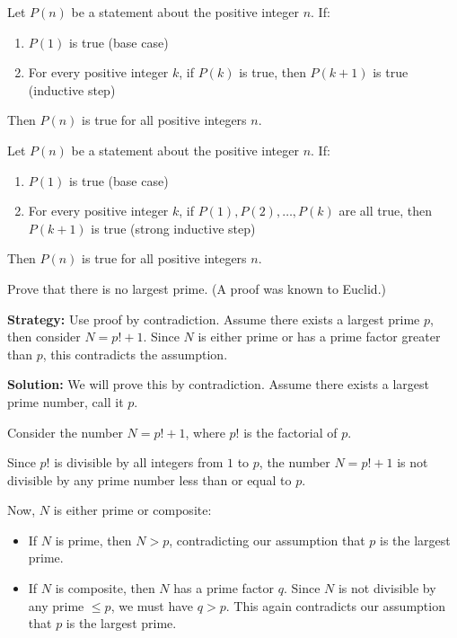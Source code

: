 \begin{theorem}
Let $P(n)$ be a statement about the positive integer $n$. If:
\begin{enumerate}
\item $P(1)$ is true (base case)
\item For every positive integer $k$, if $P(k)$ is true, then $P(k+1)$ is true (inductive step)
\end{enumerate}
Then $P(n)$ is true for all positive integers $n$.
\end{theorem}

\begin{theorem}
Let $P(n)$ be a statement about the positive integer $n$. If:
\begin{enumerate}
\item $P(1)$ is true (base case)
\item For every positive integer $k$, if $P(1), P(2), \ldots, P(k)$ are all true, then $P(k+1)$ is true (strong inductive step)
\end{enumerate}
Then $P(n)$ is true for all positive integers $n$.
\end{theorem}



\begin{problembox}
Prove that there is no largest prime. (A proof was known to Euclid.)
\end{problembox}

\noindent\textbf{Strategy:} Use proof by contradiction. Assume there exists a largest prime $p$, then consider $N = p! + 1$. Since $N$ is either prime or has a prime factor greater than $p$, this contradicts the assumption.

\bigskip\noindent\textbf{Solution:}
We will prove this by contradiction. Assume there exists a largest prime number, call it $p$.

Consider the number $N = p! + 1$, where $p!$ is the factorial of $p$. 

Since $p!$ is divisible by all integers from $1$ to $p$, the number $N = p! + 1$ is not divisible by any prime number less than or equal to $p$.

Now, $N$ is either prime or composite:
\begin{itemize}
\item If $N$ is prime, then $N > p$, contradicting our assumption that $p$ is the largest prime.
\item If $N$ is composite, then $N$ has a prime factor $q$. Since $N$ is not divisible by any prime $\leq p$, we must have $q > p$. This again contradicts our assumption that $p$ is the largest prime.
\end{itemize}

